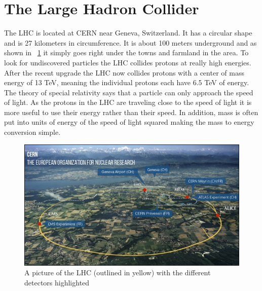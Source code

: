 
\section{The Large Hadron Collider}


The LHC is located at CERN near Geneva, Switzerland. It has a circular shape and is 27 kilometers in circumference. It is about 100 meters underground and as shown in ~\ref{fig:LHC} it simply goes right under the towns and farmland in the area. To look for undiscovered particles the LHC collides protons at really high energies. After the recent upgrade the LHC now collides protons with a center of mass energy of 13 TeV, meaning the individual protons each have 6.5 TeV of energy. The theory of special relativity says that a particle can only approach the speed of light. As the protons in the LHC are traveling close to the speed of light it is more useful to use their energy rather than their speed. In addition, mass is often put into units of energy of the speed of light squared making the mass to energy conversion simple. 

\begin{figure}
\centering
\includegraphics[width=0.8\linewidth]{Figures/LHC.png}
\caption{A picture of the LHC (outlined in yellow) with the different detectors highlighted}
\label{fig:LHC}
\end{figure}


